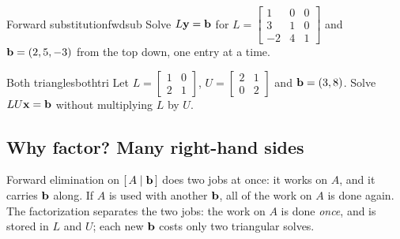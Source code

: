 \documentclass[11pt]{article}
\begin{document}
\begin{kc}{Forward substitution}{fwdsub}
Solve $L\mathbf{y}=\mathbf{b}$ for $L=\begin{bmatrix}1&0&0\\3&1&0\\-2&4&1\end{bmatrix}$ and $\mathbf{b}=(2,5,-3)$ from the top down, one entry at a time.
\end{kc}

\begin{kc}{Both triangles}{bothtri}
Let $L=\begin{bmatrix}1&0\\2&1\end{bmatrix}$, $U=\begin{bmatrix}2&1\\0&2\end{bmatrix}$ and $\mathbf{b}=(3,8)$. Solve $LU\mathbf{x}=\mathbf{b}$ without multiplying $L$ by $U$.
\end{kc}

\subsection*{Why factor? Many right-hand sides}

Forward elimination on $[\,A\mid\mathbf{b}\,]$ does two jobs at once: it works on $A$, and it carries $\mathbf{b}$ along. If $A$ is used with another $\mathbf{b}$, all of the work on $A$ is done again. The factorization separates the two jobs: the work on $A$ is done \emph{once}, and is stored in $L$ and $U$; each new $\mathbf{b}$ costs only two triangular solves.
\end{document}
